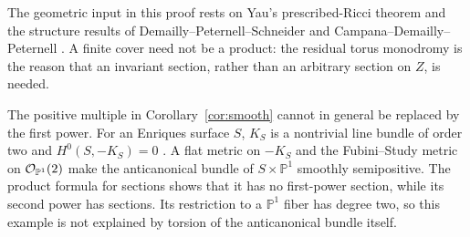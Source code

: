 The geometric input in this proof rests on Yau's prescribed-Ricci theorem \cite{Yau1978} and the structure results of Demailly--Peternell--Schneider \cite{DPS1996} and Campana--Demailly--Peternell \cite[Theorem~1.4]{CDP2015}. A finite cover need not be a product: the residual torus monodromy is the reason that an invariant section, rather than an arbitrary section on $Z$, is needed.

The positive multiple in Corollary~\ref{cor:smooth} cannot in general be replaced by the first power. For an Enriques surface $S$, $K_S$ is a nontrivial line bundle of order two and $H^0(S,-K_S)=0$ \cite{Dolgachev2016}. A flat metric on $-K_S$ and the Fubini--Study metric on $\mathcal O_{\mathbb P^1}(2)$ make the anticanonical bundle of $S\times\mathbb P^1$ smoothly semipositive. The product formula for sections shows that it has no first-power section, while its second power has sections. Its restriction to a $\mathbb P^1$ fiber has degree two, so this example is not explained by torsion of the anticanonical bundle itself.
